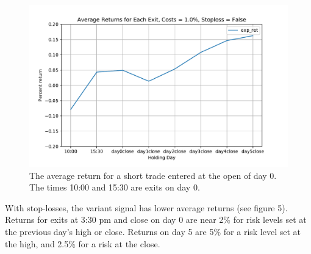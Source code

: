 \documentclass{article}
\begin{document}
\begin{figure}[!h]
\includegraphics[width=\linewidth]{avg_ret_no_stop_var_1.pdf}
\caption{The average return for a short trade entered at the open of day 0. The times 10:00 and 15:30 are exits on day 0.}
\end{figure}

With stop-losses, the variant signal has lower average returns (see figure 5). Returns for exits at 3:30 pm and close on day 0 are near 2\% for risk levels set at the previous day's high or close. Returns on day 5 are 5\% for a risk level set at the high, and 2.5\% for a risk at the close.
\end{document}
